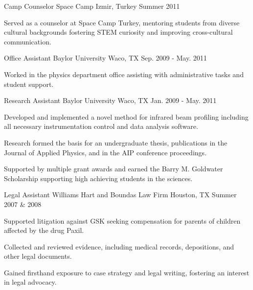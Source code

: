 \begin{cventries}
  \cventry
    {Camp Counselor} %
    {Space Camp} %
    {Izmir, Turkey} %
    {Summer 2011} %
    {
      \begin{cvitems} %
        \item {Served as a counselor at Space Camp Turkey, mentoring students from diverse cultural backgrounds fostering STEM curiosity and improving cross-cultural communication.}
      \end{cvitems}
    }

  \cventry
    {Office Assistant} %
    {Baylor University} %
    {Waco, TX} %
    {Sep. 2009 - May. 2011} %
    {
      \begin{cvitems} %
        \item {Worked in the physics department office assisting with administrative tasks and student support.}
      \end{cvitems}
    }

  \cventry
    {Research Assistant} %
    {Baylor University} %
    {Waco, TX} %
    {Jan. 2009 - May. 2011} %
    {
      \begin{cvitems} %
        \item {Developed and implemented a novel method for infrared beam profiling including all necessary instrumentation control and data analysis software.}
        \item {Research formed the basis for an undergraduate thesis, publications in the Journal of Applied Physics, and in the AIP conference proceedings.}
        \item {Supported by multiple grant awards and earned the Barry M. Goldwater Scholarship supporting high achieving students in the sciences.}
      \end{cvitems}
    }

  \cventry
    {Legal Assistant} %
    {Williams Hart and Boundas Law Firm} %
    {Houston, TX} %
    {Summer 2007 \& 2008} %
    {
      \begin{cvitems} %
        \item {Supported litigation against GSK seeking compensation for parents of children affected by the drug Paxil.}
        \item {Collected and reviewed evidence, including medical records, depositions, and other legal documents.}
        \item {Gained firsthand exposure to case strategy and legal writing, fostering an interest in legal advocacy.}
      \end{cvitems}
    }


\end{cventries}
